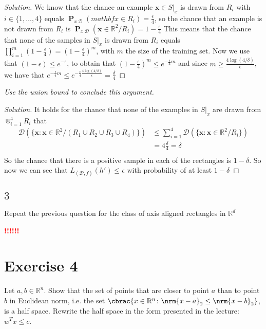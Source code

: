 \documentclass[10pt, a4paper, twoside]{amsart}
\newcommand{\R}{\ensuremath{\mathbb{R}}}
\DeclarePairedDelimiter\cbrac\{\}
\DeclarePairedDelimiter{\nrm}\lVert\rVert
\renewcommand{\c}{\ensuremath{\colon}}
\renewcommand{\P}{\operatorname*{\ensuremath{\mathbf{P}}}}
\newenvironment{solution}
               {\let\oldqedsymbol=\qedsymbol
                \renewcommand{\qedsymbol}{$\blacktriangleleft$}
                \begin{proof}[Solution]}
               {\end{proof}
                \renewcommand{\qedsymbol}{\oldqedsymbol}}
\newcommand{\TODO}{\textcolor{red}{\textbf{!!!!!! }}}
\begin{document}
\begin{solution}
  We know that the chance an example $\mathbf{x} \in S|_x$ is drawn from $R_i$ with $i \in \{1,\ldots, 4\}$ equals $\P_{x~\mathcal{D}}(mathbf{x}\in R_i) = \frac{\epsilon}{4}$, so the chance that an example is not drawn from $R_i$ is $\P_{x~\mathcal{D}}(\mathbf{x}\in \R^2/R_i) = 1-\frac{\epsilon}{4}$ This means that the chance that none of the samples in $S|_x$ is drawn from $R_i$ equals $\prod_{i = 1}^m(1-\frac{\epsilon}{4}) = (1-\frac{\epsilon}{4})^m$, with $m$ the size of the training set. Now we use that $(1-\epsilon)\leq e^{-\epsilon}$, to obtain that $(1-\frac{\epsilon}{4})^m \leq e^{- \frac{\epsilon}{4}m}$ and since $m \geq \frac{4\log (4/\delta)}{\epsilon}$, we have that $e^{- \frac{\epsilon}{4}m} \leq e^{-\frac{\epsilon}{4}\frac{4\log (4/\delta)}{\epsilon}}= \frac{\delta}{4}$
\end{solution}
\textit{Use the union bound to conclude this argument.} \\
\begin{solution}
  It holds for the chance that none of the examples in $S|_x$ are drawn from $\Cup_{i=1}^4 R_i$  that
\begin{align*}
  \mathcal{D}(\{\mathbf{x}:\mathbf{x}\in \R^2/(R_1 \cup R_2 \cup R_3 \cup R_4)\}) & \leq \sum_{i=1}^4 \mathcal{D}(\{\mathbf{x}:\mathbf{x}\in \R^2/R_i\}) \\
                                                                                 & = 4\frac{\delta}{4} = \delta \\
\end{align*}
So the chance that there is a positive sample in each of the rectangles is $1-\delta$. So now we can see that $L_{(\mathcal{D},f)}(h')\leq \epsilon$ with probability of at least $1 - \delta$
\end{solution}
\subsection*{$3$}
Repeat the previous question for the class of axis aligned rectangles in $\R^d$

\TODO



\section*{Exercise 4}
Let $a, b \in \R^n$. 
Show that the set of points that are closer to point $a$ than to point $b$ in Euclidean norm, 
i.e. the set $\cbrac{x \in \R^n \c \nrm{x-a}_2 \leq \nrm{x-b}_2}$, is a half space. 
Rewrite the half space in the form presented in the lecture: $w^T x \leq c$.
\end{document}
